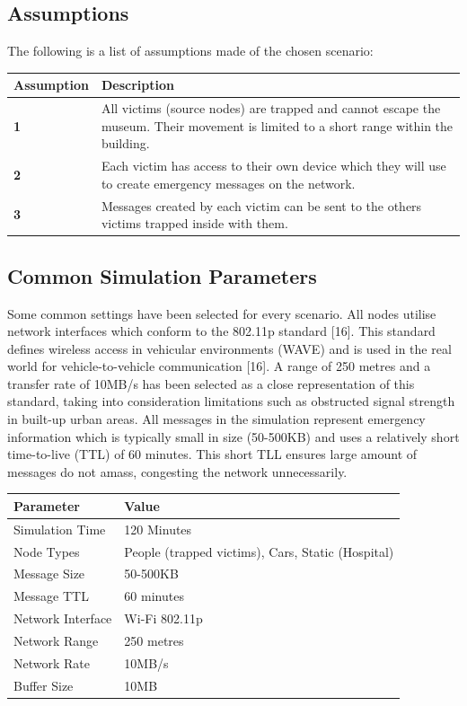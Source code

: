 \documentclass{article}
\begin{document}
\subsection{Assumptions}
The following is a list of assumptions made of the chosen scenario:
\begin{center}
\begin{tabular}{|l|p{13cm}|}
\hline
\textbf{Assumption} & \textbf{Description} \\ \hline
\textbf{1} & All victims (source nodes) are trapped and cannot escape the museum. Their movement is limited to a short range within the building. \\ \hline
\textbf{2} & Each victim has access to their own device which they will use to create emergency messages on the network. \\ \hline
\textbf{3} & Messages created by each victim can be sent to the others victims trapped inside with them. \\ \hline
\end{tabular}
\end{center}

\subsection{Common Simulation Parameters}
Some common settings have been selected for every scenario. All nodes utilise network interfaces which conform to the 802.11p standard [16]. This standard defines wireless access in vehicular environments (WAVE) and is used in the real world for vehicle-to-vehicle communication [16]. A range of 250 metres and a transfer rate of 10MB/s has been selected as a close representation of this standard, taking into consideration limitations such as obstructed signal strength in built-up urban areas. All messages in the simulation represent emergency information which is typically small in size (50-500KB) and uses a relatively short time-to-live (TTL) of 60 minutes. This short TLL ensures large amount of messages do not amass, congesting the network unnecessarily.\\
\begin{center}
\begin{tabular}{|l|l|}
\hline
\textbf{Parameter} & \textbf{Value} \\ \hline
Simulation Time & 120 Minutes \\ \hline
Node Types & People (trapped victims), Cars, Static (Hospital) \\ \hline
Message Size & 50-500KB \\ \hline
Message TTL & 60 minutes \\ \hline
Network Interface & Wi-Fi 802.11p \\ \hline
Network Range & 250 metres \\ \hline
Network Rate & 10MB/s \\ \hline
Buffer Size & 10MB \\ \hline
\end{tabular}
\end{center}
\end{document}
